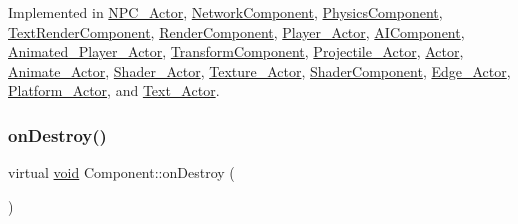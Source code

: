 Implemented in \hyperlink{classNPC__Actor_ab274d0517bd0cd710efc7df31cd7450b}{N\+P\+C\+\_\+\+Actor}, \hyperlink{classNetworkComponent_a3361f9b02b8b5c0bed3beb4d70c28bdb}{Network\+Component}, \hyperlink{classPhysicsComponent_a5a5e472f0c6975d4a22e0990c504ec0a}{Physics\+Component}, \hyperlink{classTextRenderComponent_a097fb07ecd0e1feed1c4c2bd7c97d480}{Text\+Render\+Component}, \hyperlink{classRenderComponent_a2d05ddd16edf5d2022d46a640a74a4da}{Render\+Component}, \hyperlink{classPlayer__Actor_a200b6b956d9c597cbc626ca9bcafb25e}{Player\+\_\+\+Actor}, \hyperlink{classAIComponent_a82e8e79810024e09695545ebf59452f2}{A\+I\+Component}, \hyperlink{classAnimated__Player__Actor_ac6c4259340bfa000195b69f7eef1ae17}{Animated\+\_\+\+Player\+\_\+\+Actor}, \hyperlink{classTransformComponent_aab0dd130a6c8d4d6f873f81e59e48ee0}{Transform\+Component}, \hyperlink{classProjectile__Actor_a58d01ff77f0815ca611236f139b7aafa}{Projectile\+\_\+\+Actor}, \hyperlink{classActor_a47101d6275509662bf6c84c3f3439696}{Actor}, \hyperlink{classAnimate__Actor_ae67ff6399f3d46696f84c77b2e519ead}{Animate\+\_\+\+Actor}, \hyperlink{classShader__Actor_a16f7f5f30d3f3cd125de9713457a7db2}{Shader\+\_\+\+Actor}, \hyperlink{classTexture__Actor_ac9677f60df27e14ef3550ae2b0678ad5}{Texture\+\_\+\+Actor}, \hyperlink{classShaderComponent_a7ebd7c8ee1b2aea5ad2010a4652bb588}{Shader\+Component}, \hyperlink{classEdge__Actor_ae7a429d48b86442154c93eb65bc8b22d}{Edge\+\_\+\+Actor}, \hyperlink{classPlatform__Actor_a34b915aa583cdf659ec29368b6feb7e8}{Platform\+\_\+\+Actor}, and \hyperlink{classText__Actor_af9b25da889aad4aec6f17671c37ac431}{Text\+\_\+\+Actor}.

\mbox{\label{classComponent_a2b198f27162a6caf63917e304295f892}} 
\subsubsection{\texorpdfstring{on\+Destroy()}{onDestroy()}\hspace{0.1cm}{\footnotesize\ttfamily [2/2]}}
{\footnotesize\ttfamily virtual \hyperlink{imgui__impl__opengl3__loader_8h_ac668e7cffd9e2e9cfee428b9b2f34fa7}{void} Component\+::on\+Destroy (\begin{DoxyParamCaption}{ }\end{DoxyParamCaption})\hspace{0.3cm}{\ttfamily [pure virtual]}}



